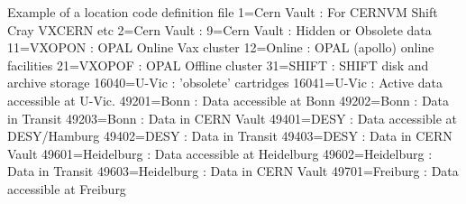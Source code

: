 \begin{XMPt}{Example of a location code definition file}
         1=Cern Vault  :   For CERNVM Shift Cray VXCERN etc                                                                         
         2=Cern Vault  :                                                                                                            
         9=Cern Vault  :   Hidden or Obsolete data                                                                                  
        11=VXOPON      :   OPAL Online Vax cluster                                                                                  
        12=Online      :   OPAL (apollo) online facilities                                                                          
        21=VXOPOF      :   OPAL Offline cluster                                                                                     
        31=SHIFT       :   SHIFT disk and archive storage                                                                           
     16040=U-Vic       :   'obsolete' cartridges                                                                                    
     16041=U-Vic       :   Active data accessible at U-Vic.                                                                         
     49201=Bonn        :   Data accessible at Bonn                                                                                  
     49202=Bonn        :   Data in Transit                                                                                          
     49203=Bonn        :   Data in CERN Vault                                                                                       
     49401=DESY        :   Data accessible at DESY/Hamburg                                                                          
     49402=DESY        :   Data in Transit                                                                                          
     49403=DESY        :   Data in CERN Vault                                                                                       
     49601=Heidelburg  :   Data accessible at Heidelburg                                                                            
     49602=Heidelburg  :   Data in Transit                                                                                          
     49603=Heidelburg  :   Data in CERN Vault                                                                                       
     49701=Freiburg    :   Data accessible at Freiburg                                                                              

\end{XMPt}

